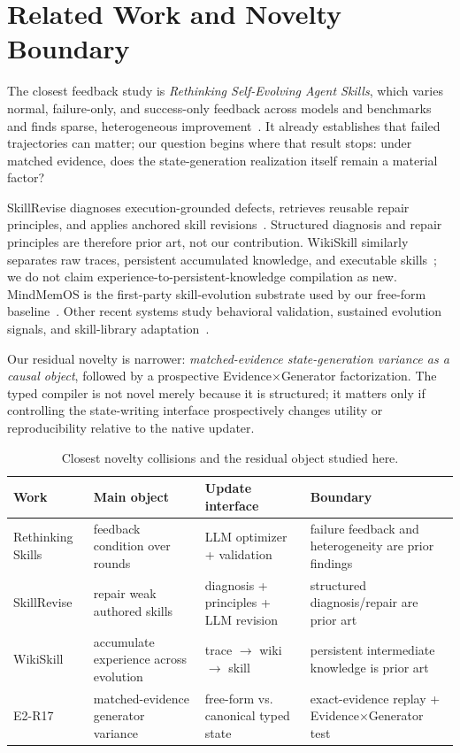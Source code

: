 \section{Related Work and Novelty Boundary}

The closest feedback study is \emph{Rethinking Self-Evolving Agent Skills}, which varies normal, failure-only, and success-only feedback across models and benchmarks and finds sparse, heterogeneous improvement~\citep{liu2026rethinking}. It already establishes that failed trajectories can matter; our question begins where that result stops: under matched evidence, does the state-generation realization itself remain a material factor?

SkillRevise diagnoses execution-grounded defects, retrieves reusable repair principles, and applies anchored skill revisions~\citep{liu2026skillrevise}. Structured diagnosis and repair principles are therefore prior art, not our contribution. WikiSkill similarly separates raw traces, persistent accumulated knowledge, and executable skills~\citep{tang2026wikiskill}; we do not claim experience-to-persistent-knowledge compilation as new. MindMemOS is the first-party skill-evolution substrate used by our free-form baseline~\citep{liang2026mindmemos}. Other recent systems study behavioral validation, sustained evolution signals, and skill-library adaptation~\citep{he2026skillcommit,yan2026skillevo,han2026sisl}.

Our residual novelty is narrower: \emph{matched-evidence state-generation variance as a causal object}, followed by a prospective Evidence$\times$Generator factorization. The typed compiler is not novel merely because it is structured; it matters only if controlling the state-writing interface prospectively changes utility or reproducibility relative to the native updater.

\begin{table}[t]
\centering
\footnotesize
\setlength{\tabcolsep}{3pt}
\begin{tabularx}{\linewidth}{>{\raggedright\arraybackslash}p{1.6cm}>{\raggedright\arraybackslash}X>{\raggedright\arraybackslash}X>{\raggedright\arraybackslash}X}
\toprule
Work & Main object & Update interface & Boundary \\
\midrule
Rethinking Skills & feedback condition over rounds & LLM optimizer + validation & failure feedback and heterogeneity are prior findings \\
SkillRevise & repair weak authored skills & diagnosis + principles + LLM revision & structured diagnosis/repair are prior art \\
WikiSkill & accumulate experience across evolution & trace $\rightarrow$ wiki $\rightarrow$ skill & persistent intermediate knowledge is prior art \\
E2-R17 & matched-evidence generator variance & free-form vs. canonical typed state & exact-evidence replay + Evidence$\times$Generator test \\
\bottomrule
\end{tabularx}
\caption{Closest novelty collisions and the residual object studied here.}
\label{tab:related}
\end{table}
